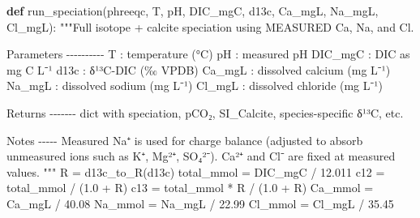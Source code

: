 \documentclass[
  letterpaper,
  DIV=11,
  numbers=noendperiod]{scrartcl}
\newenvironment{Shaded}{\begin{snugshade}}{\end{snugshade}}
\newcommand{\CommentTok}[1]{\textcolor[rgb]{0.37,0.37,0.37}{#1}}
\newcommand{\FloatTok}[1]{\textcolor[rgb]{0.68,0.00,0.00}{#1}}
\newcommand{\KeywordTok}[1]{\textcolor[rgb]{0.00,0.23,0.31}{\textbf{#1}}}
\newcommand{\NormalTok}[1]{\textcolor[rgb]{0.00,0.23,0.31}{#1}}
\newcommand{\OperatorTok}[1]{\textcolor[rgb]{0.37,0.37,0.37}{#1}}
\begin{document}
\begin{Shaded}
\begin{Highlighting}[]
\KeywordTok{def}\NormalTok{ run\_speciation(phreeqc, T, pH, DIC\_mgC, d13c, Ca\_mgL, Na\_mgL, Cl\_mgL):}
    \CommentTok{"""Full isotope + calcite speciation using MEASURED Ca, Na, and Cl.}

\CommentTok{    Parameters}
\CommentTok{    {-}{-}{-}{-}{-}{-}{-}{-}{-}{-}}
\CommentTok{    T       : temperature (°C)}
\CommentTok{    pH      : measured pH}
\CommentTok{    DIC\_mgC : DIC as mg C L⁻¹}
\CommentTok{    d13c    : δ¹³C{-}DIC (‰ VPDB)}
\CommentTok{    Ca\_mgL  : dissolved calcium (mg L⁻¹)}
\CommentTok{    Na\_mgL  : dissolved sodium (mg L⁻¹)}
\CommentTok{    Cl\_mgL  : dissolved chloride (mg L⁻¹)}

\CommentTok{    Returns}
\CommentTok{    {-}{-}{-}{-}{-}{-}{-}}
\CommentTok{    dict with speciation, pCO₂, SI\_Calcite, species{-}specific δ¹³C, etc.}

\CommentTok{    Notes}
\CommentTok{    {-}{-}{-}{-}{-}}
\CommentTok{    Measured Na⁺ is used for charge balance (adjusted to absorb unmeasured}
\CommentTok{    ions such as K⁺, Mg²⁺, SO₄²⁻).  Ca²⁺ and Cl⁻ are fixed at measured}
\CommentTok{    values.}
\CommentTok{    """}
\NormalTok{    R }\OperatorTok{=}\NormalTok{ d13c\_to\_R(d13c)}
\NormalTok{    total\_mmol }\OperatorTok{=}\NormalTok{ DIC\_mgC }\OperatorTok{/} \FloatTok{12.011}
\NormalTok{    c12 }\OperatorTok{=}\NormalTok{ total\_mmol }\OperatorTok{/}\NormalTok{ (}\FloatTok{1.0} \OperatorTok{+}\NormalTok{ R)}
\NormalTok{    c13 }\OperatorTok{=}\NormalTok{ total\_mmol }\OperatorTok{*}\NormalTok{ R }\OperatorTok{/}\NormalTok{ (}\FloatTok{1.0} \OperatorTok{+}\NormalTok{ R)}
\NormalTok{    Ca\_mmol }\OperatorTok{=}\NormalTok{ Ca\_mgL }\OperatorTok{/} \FloatTok{40.08}
\NormalTok{    Na\_mmol }\OperatorTok{=}\NormalTok{ Na\_mgL }\OperatorTok{/} \FloatTok{22.99}
\NormalTok{    Cl\_mmol }\OperatorTok{=}\NormalTok{ Cl\_mgL }\OperatorTok{/} \FloatTok{35.45}


\end{Highlighting}
\end{Shaded}
\end{document}
